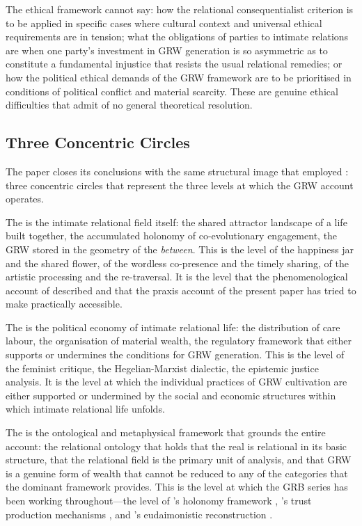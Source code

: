 The ethical framework cannot say: how the relational consequentialist criterion is to be applied in specific cases where cultural context and universal ethical requirements are in tension; what the obligations of parties to intimate relations are when one party's investment in GRW generation is so asymmetric as to constitute a fundamental injustice that resists the usual relational remedies; or how the political ethical demands of the GRW framework are to be prioritised in conditions of political conflict and material scarcity. These are genuine ethical difficulties that admit of no general theoretical resolution.

\subsection{Three Concentric Circles}
\label{p15:subsec:circles}

\noindent
The paper closes its conclusions with the same structural image that  employed \parencite{paperxiv}: three concentric circles that represent the three levels at which the GRW account operates.

The  is the intimate relational field itself: the shared attractor landscape of a life built together, the accumulated holonomy of co-evolutionary engagement, the GRW stored in the geometry of the \emph{between}. This is the level of the happiness jar and the shared flower, of the wordless co-presence and the timely sharing, of the artistic processing and the re-traversal. It is the level that the phenomenological account of  described and that the praxis account of the present paper has tried to make practically accessible.

The  is the political economy of intimate relational life: the distribution of care labour, the organisation of material wealth, the regulatory framework that either supports or undermines the conditions for GRW generation. This is the level of the feminist critique, the Hegelian-Marxist dialectic, the epistemic justice analysis. It is the level at which the individual practices of GRW cultivation are either supported or undermined by the social and economic structures within which intimate relational life unfolds.

The  is the ontological and metaphysical framework that grounds the entire account: the relational ontology that holds that the real is relational in its basic structure, that the relational field is the primary unit of analysis, and that GRW is a genuine form of wealth that cannot be reduced to any of the categories that the dominant framework provides. This is the level at which the GRB series has been working throughout---the level of 's holonomy framework \parencite{paperix}, 's trust production mechanisms \parencite{paperxiii}, and 's eudaimonistic reconstruction \parencite{paperxiv}.

